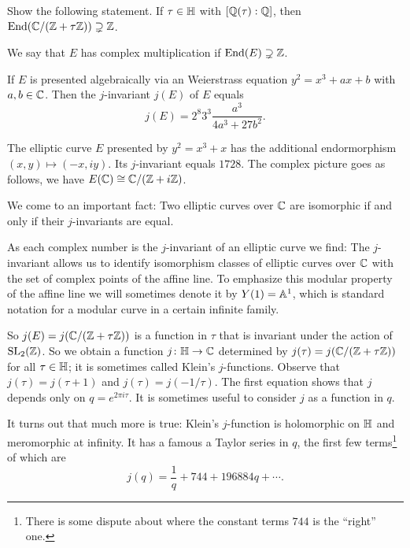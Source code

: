 \begin{exercise}
  Show the following statement. If $\tau \in{\mathbb{H}}$  with
  $[{\mathbb{Q}}(\tau):{\mathbb{Q}}]$, then $\mathrm{End}({\mathbb{C}}/({\mathbb{Z}}+\tau {\mathbb{Z}}))\supsetneq
  {\mathbb{Z}}$. 
\end{exercise}

\begin{definition}
  We say that $E$ has complex multiplication if
  $\mathrm{End}(E)\supsetneq {\mathbb{Z}}$. 
\end{definition}

If $E$ is presented algebraically via an Weierstrass equation $y^2 =
x^3+ax+b$ with $a,b\in{\mathbb{C}}$. Then the $j$-invariant $j(E)$ of $E$ equals
\begin{equation*}
  j(E) = 2^8 3^3 \frac{a^3}{4a^3+27b^2}. 
\end{equation*}

\begin{example}
  The elliptic curve $E$ presented by $y^2=x^3+x$ has the additional
  endormorphism
  $(x,y)\mapsto (-x, i y)$. Its $j$-invariant equals $1728$. The
  complex picture goes as follows, we have $E({\mathbb{C}})\cong {\mathbb{C}}/({\mathbb{Z}}+i
  {\mathbb{Z}})$. 
\end{example}

We come to an important fact: Two elliptic curves over ${\mathbb{C}}$ are
isomorphic if and only if their $j$-invariants are equal.

As each complex number is the $j$-invariant of an elliptic curve we
find: The $j$-invariant allows us to identify  isomorphism classes of
elliptic curves over ${\mathbb{C}}$ with the set of complex points of the
affine line.
To emphasize this modular property of the affine line we will
sometimes denote it by $Y(1)={\mathbb{A}}^1$, which is standard notation for a
modular curve in a certain infinite family. 


So $j(E) = j({\mathbb{C}}/({\mathbb{Z}}+\tau{\mathbb{Z}}))$ is a
function in $\tau$ that is invariant under the action of
$\mathrm{SL}_2({\mathbb{Z}})$. So we obtain a function $j\colon {\mathbb{H}}\rightarrow
{\mathbb{C}}$ determined by $j(\tau) = j({\mathbb{C}}/({\mathbb{Z}}+\tau{\mathbb{Z}}))$ for all
$\tau\in{\mathbb{H}}$; it is sometimes called Klein's $j$-functions.
Observe that $j(\tau)=j(\tau+1)$ and $j(\tau) =
j(-1/\tau)$. The first equation shows that $j$ depends only on
$q=e^{2\pi i \tau}$. It is sometimes useful to consider $j$ as a
function in $q$. 

It turns out that much more is true: Klein's $j$-function is
holomorphic on ${\mathbb{H}}$ and meromorphic at infinity. It has a famous 
a Taylor series in $q$, the first few terms\footnote{There is some
  dispute about where the constant terms $744$ is the ``right'' one.} of which are 
\begin{equation*}
  j(q) = \frac 1q + 744 + 196884q +\cdots. 
\end{equation*}

